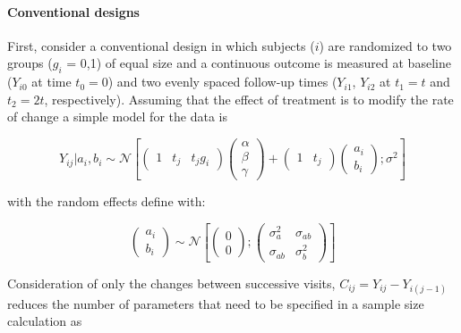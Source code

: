 \documentclass[final, paper=letter,5p,times,twocolumn]{elsarticle}
\theoremstyle{definition}
\begin{document}
\paragraph{Conventional designs}{First, consider a conventional design in which subjects ($i$) are randomized to two groups ($g_{i}$ = 0,1) of equal size and a continuous outcome is measured at baseline ($Y_{i0}$ at time $t_{0} = 0$) and two evenly spaced follow-up times ($Y_{i1}$, $Y_{i2}$ at $t_{1} = t$ and $t_{2} = 2t$, respectively). Assuming that the effect of treatment is to modify the rate of change a simple model for the data is

\begin{equation*}
  Y_{ij}|a_{i}, b_{i} \sim \mathcal{N} \left[
    \left(
    \begin{array}{ccc}
      1 & t_{j} & t_{j}g_{i}
    \end{array}
    \right)
    \left(
    \begin{array}{c}
      \alpha \\
      \beta \\
      \gamma
    \end{array}
    \right) +     \left(
    \begin{array}{cc}
      1 & t_{j}
    \end{array}
    \right)
    \left(
    \begin{array}{c}
      a_{i} \\
      b_{i}
    \end{array}
    \right) ; \sigma^{2}
    \right]
\end{equation*}

with the random effects define with:

\begin{equation*}
  \left(
  \begin{array}{c}
    a_{i} \\
    b_{i}
  \end{array}
  \right) \sim \mathcal{N} \left[
      \left(
  \begin{array}{c}
    0 \\
    0
  \end{array}
  \right) ;  \left(
  \begin{array}{cc}
    \sigma_{a}^{2} & \sigma_{ab} \\
    \sigma_{ab} & \sigma_{b}^{2}
  \end{array}
  \right) 
    \right]
\end{equation*}

Consideration of only the changes between successive visits, $C_{ij} = Y_{ij} - Y_{i(j-1)}$ reduces the number of parameters that need to be specified in a sample size calculation as

}
\end{document}
